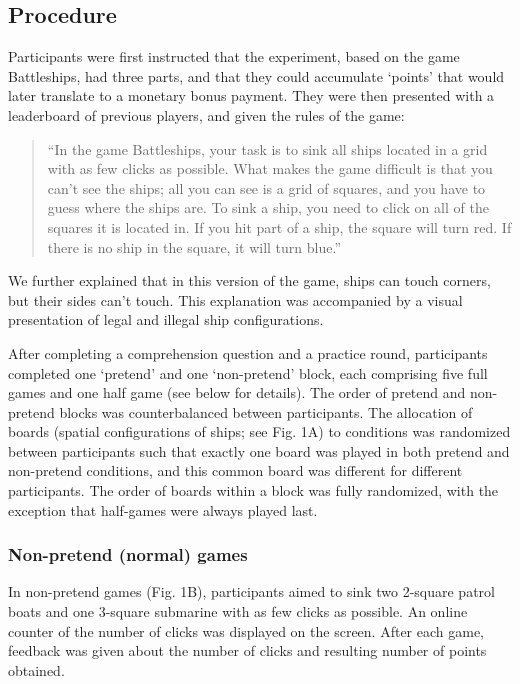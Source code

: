 \documentclass[10pt, letterpaper]{article}
\begin{document}
\hypertarget{procedure}{%
\subsection{Procedure}\label{procedure}}

Participants were first instructed that the experiment, based on the
game Battleships, had three parts, and that they could accumulate
`points' that would later translate to a monetary bonus payment. They
were then presented with a leaderboard of previous players, and given
the rules of the game:

\begin{quote}
``In the game Battleships, your task is to sink all ships located in a
grid with as few clicks as possible. What makes the game difficult is
that you can't see the ships; all you can see is a grid of squares, and
you have to guess where the ships are. To sink a ship, you need to click
on all of the squares it is located in. If you hit part of a ship, the
square will turn red. If there is no ship in the square, it will turn
blue.''
\end{quote}

We further explained that in this version of the game, ships can touch
corners, but their sides can't touch. This explanation was accompanied
by a visual presentation of legal and illegal ship configurations.

After completing a comprehension question and a practice round,
participants completed one `pretend' and one `non-pretend' block, each
comprising five full games and one half game (see below for details).
The order of pretend and non-pretend blocks was counterbalanced between
participants. The allocation of boards (spatial configurations of ships;
see Fig. 1A) to conditions was randomized between participants such that
exactly one board was played in both pretend and non-pretend conditions,
and this common board was different for different participants. The
order of boards within a block was fully randomized, with the exception
that half-games were always played last.

\hypertarget{non-pretend-normal-games}{%
\subsubsection{Non-pretend (normal)
games}\label{non-pretend-normal-games}}

In non-pretend games (Fig. 1B), participants aimed to sink two 2-square
patrol boats and one 3-square submarine with as few clicks as possible.
An online counter of the number of clicks was displayed on the screen.
After each game, feedback was given about the number of clicks and
resulting number of points obtained.
\end{document}
